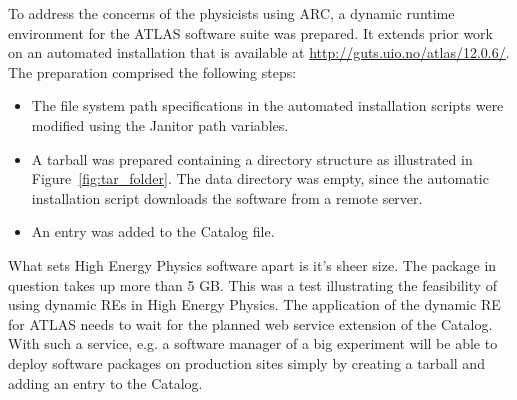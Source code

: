 

To address the concerns of the physicists using ARC, a dynamic runtime
environment for the ATLAS software suite was prepared. It extends prior
work on an automated installation that is available at
\href{http://guts.uio.no/atlas/12.0.6/}{http://guts.uio.no/atlas/12.0.6/}.
The preparation comprised the following steps:
\begin{itemize}
    \item The file system path specifications in the automated
       installation scripts were modified using the Janitor
       path variables.
    \item A tarball was prepared containing a directory structure as
       illustrated in Figure~\ref{fig:tar_folder}. The data directory
       was empty, since the automatic installation script downloads the
       software from a remote server.
    \item An entry was added to the Catalog file.
\end{itemize}

What sets High Energy Physics software apart is it's sheer size. The
package in question takes up more than 5 GB. This was a test illustrating
the feasibility of using dynamic REs in High Energy Physics. The
application of the dynamic RE for ATLAS needs to wait for the planned web
service extension of the Catalog. With such a service, e.g. a software
manager of a big experiment will be able to deploy software packages
on production sites simply by creating a tarball and adding an entry to
the Catalog.


%
%
%
%



